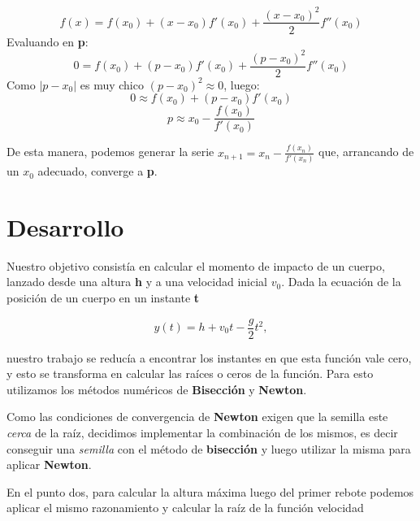 \documentclass[a4paper]{article}
\begin{document}
$$f(x) = f(x_0) + (x - x_0)f'(x_0) + \frac{(x - x_0)^2}{2}f''(x_0)$$
Evaluando en \textbf{p}:
$$0 = f(x_0) + (p - x_0)f'(x_0) + \frac{(p - x_0)^2}{2}f''(x_0)$$
Como  $|p - x_0|$ es muy chico $(p - x_0)^2 \approx 0$, luego:  
$$0 \approx f(x_0) + (p - x_0)f'(x_0)$$
$$p \approx x_0 - \frac{f(x_0)}{f'(x_0)}$$

De esta manera, podemos generar la serie $x_{n + 1} = x_n - \frac{f(x_n)}{f'(x_n)}$ que, arrancando de un $x_0$ adecuado, converge a \textbf{p}.

\newpage

\section{Desarrollo}

Nuestro objetivo consistía en calcular el momento de impacto de un cuerpo, lanzado desde una altura \textbf{h} y a una velocidad inicial \textbf{$v_0$}. Dada la ecuación de la posición de un cuerpo en un instante \textbf{t}

\begin{equation}
 y(t) = h + v_0 t - \frac{g}{2} t^2,
\end{equation}

nuestro trabajo se reducía a encontrar los instantes en que esta función vale cero, y esto se transforma en calcular las raíces o ceros de la función. Para esto utilizamos los métodos numéricos de \textbf{Bisección} y \textbf{Newton}.

Como las condiciones de convergencia de \textbf{Newton} exigen que la semilla este \textit{cerca} de la raíz, decidimos implementar la combinación de los mismos, es decir conseguir una \textit{semilla} con el método de \textbf{bisección} y luego utilizar la misma para aplicar \textbf{Newton}. \\ \hspace{1em}

En el punto dos, para calcular la altura máxima luego del primer rebote podemos aplicar el mismo razonamiento y calcular la raíz de la función velocidad
\end{document}
